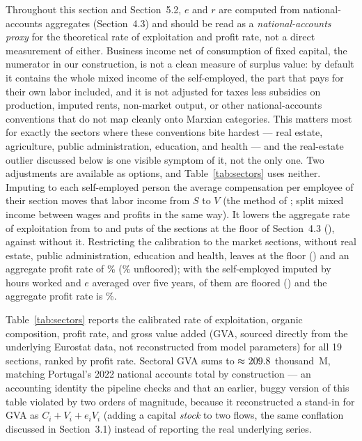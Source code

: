 \documentclass[11pt]{article}
\begin{document}
Throughout this section and Section~5.2, $e$ and $r$ are computed from
national-accounts aggregates (Section~4.3) and should be read as a
\emph{national-accounts proxy} for the theoretical rate of exploitation
and profit rate, not a direct measurement of either. Business income net
of consumption of fixed capital, the numerator in our construction, is
not a clean measure of surplus value: by default it contains the whole
mixed income of the self-employed, the part that pays for their own
labor included, and it is not adjusted for taxes less subsidies on
production, imputed rents, non-market output, or other
national-accounts conventions that do not map cleanly onto Marxian
categories. This matters most for exactly the sectors where these
conventions bite hardest --- real estate, agriculture, public
administration, education, and health --- and the real-estate outlier
discussed below is one visible symptom of it, not the only one. Two
adjustments are available as options, and Table~\ref{tab:sectors} uses
neither. Imputing to each self-employed person the average compensation
per employee of their section moves that labor income from $S$ to $V$
(the method of \citealp[ch.~7]{shaikh2016capitalism}; \citealp{marquetti2010profit}
split mixed income between wages and profits in the same way). It lowers
the aggregate rate of exploitation from \FloorAggE{} to
\FloorImputedAggE{} and puts \FloorImputedN{} of the
\FloorImputedSectors{} sections at the floor of Section~4.3
(\FloorImputedCodes), against \FloorN{} without it. Restricting the
calibration to the \FloorMarketSectors{} market sections, without real
estate, public administration, education and health, leaves
\FloorMarketN{} at the floor (\FloorMarketCodes) and an aggregate profit
rate of \FloorMarketAggR\% (\FloorMarketAggRRaw\% unfloored); with the
self-employed imputed by hours worked and $e$ averaged over five years,
\FloorMarketImputedN{} of them are floored (\FloorMarketImputedCodes) and
the aggregate profit rate is \FloorMarketImputedAggR\%.

Table~\ref{tab:sectors} reports the calibrated rate of exploitation, organic composition,
profit rate, and gross value added (GVA, sourced directly from the
underlying Eurostat data, not reconstructed from model parameters) for
all 19 sections, ranked by profit rate. Sectoral GVA sums to
$\approx\mkern1mu209.8$ thousand~M\texteuro, matching Portugal's 2022
national accounts total by construction --- an accounting identity the
pipeline checks and that an earlier, buggy version of this table
violated by two orders of magnitude, because it reconstructed a stand-in
for GVA as $C_i+V_i+e_iV_i$ (adding a capital \emph{stock} to two flows,
the same conflation discussed in Section~3.1) instead of reporting the
real underlying series.
\end{document}
